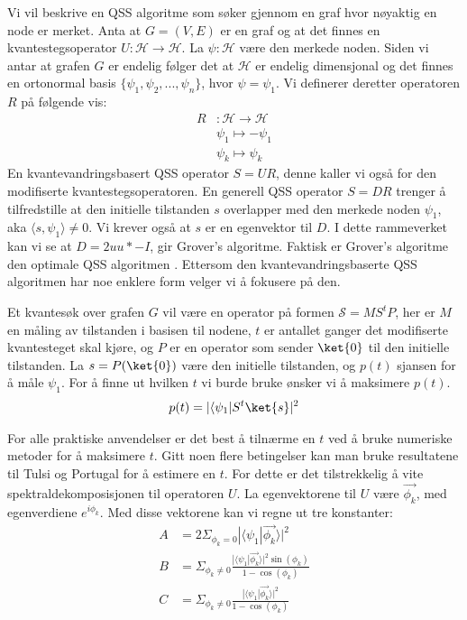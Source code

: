         Vi vil beskrive en QSS algoritme som søker gjennom en graf hvor nøyaktig en node er merket. Anta at $G=(V,E)$ er en graf og at det finnes en kvantestegsoperator $U:\mathcal{H}\rightarrow\mathcal{H}$. La $\psi:\mathcal{H}$ være den merkede noden. Siden vi antar at grafen $G$ er endelig følger det at $\mathcal{H}$ er endelig dimensjonal og det finnes en ortonormal basis $\{\psi_1, \psi_2, ..., \psi_n\}$, hvor $\psi=\psi_1$. Vi definerer deretter operatoren $R$ på følgende vis:
        \begin{align*}
            R & :\mathcal{H}\rightarrow\mathcal{H} \\
            & \psi_1 \mapsto -\psi_1 \\
            &\psi_k \mapsto \psi_k
        \end{align*}
        En kvantevandringsbasert QSS operator $S=UR$, denne kaller vi også for den modifiserte kvantestegsoperatoren. En generell QSS operator $S=DR$ trenger å tilfredstille at den initielle tilstanden $s$ overlapper med den merkede noden $\psi_1$, aka $\langle s,\psi_1\rangle\neq 0$. Vi krever også at $s$ er en egenvektor til $D$. I dette rammeverket kan vi se at $D=2uu*-I$, gir Grover's algoritme. Faktisk er Grover's algoritme den optimale QSS algoritmen \cite{Zalka_1999}. Ettersom den kvantevandringsbaserte QSS algoritmen har noe enklere form velger vi å fokusere på den.
        
        Et kvantesøk over grafen $G$ vil være en operator på formen $\mathcal{S} = MS^tP$, her er $M$ en måling av tilstanden i basisen til nodene, $t$ er antallet ganger det modifiserte kvantesteget skal kjøre, og $P$ er en operator som sender $\ket{0}$ til den initielle tilstanden. La $s = P(\ket{0})$ være den initielle tilstanden, og $p(t)$ sjansen for å måle $\psi_1$. For å finne ut hvilken $t$ vi burde bruke ønsker vi å maksimere $p(t)$.
        \begin{align*}
            p(t) = |\langle\psi_1|S^t\ket{s}|^2 
        \end{align*}

        For alle praktiske anvendelser er det best å tilnærme en $t$ ved å bruke numeriske metoder for å maksimere $t$. Gitt noen flere betingelser kan man bruke resultatene til Tulsi og Portugal for å estimere en $t$. For dette er det tilstrekkelig å vite spektraldekomposisjonen til operatoren $U$. La egenvektorene til $U$ være $\vec{\phi_k}$, med egenverdiene $e^{i\phi_k}$. Med disse vektorene kan vi regne ut tre konstanter:
        \begin{align*}
            A & = 2\Sigma_{\phi_k=0}|\langle\psi_1|\vec{\phi_k}\rangle|^2 \\
            B & = \Sigma_{\phi_k\neq 0}\frac{|\langle\psi_1|\vec{\phi_k}\rangle|^2\sin(\phi_k)}{1-\cos(\phi_k)} \\
            C & = \Sigma_{\phi_k\neq 0}\frac{|\langle\psi_1|\vec{\phi_k}\rangle|^2}{1-\cos(\phi_k)}
        \end{align*}

